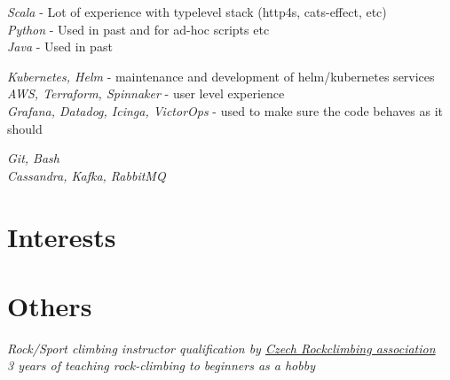 \documentclass[10pt]{article} %
\begin{document}
{
\textit{Scala} - Lot of experience with typelevel stack (http4s, cats-effect, etc)\\
\textit{Python} - Used in past and for ad-hoc scripts etc\\
\textit{Java} - Used in past\\
}


{
\textit{Kubernetes, Helm} - maintenance and development of helm/kubernetes services\\
\textit{AWS, Terraform, Spinnaker} - user level experience\\
\textit{Grafana, Datadog, Icinga, VictorOps} - used to make sure the code behaves as it should \\
}

{
\textit{Git, Bash} \\
\textit{Cassandra, Kafka, RabbitMQ}
}



\section{Interests}



\section{Others}
{
\textit{Rock/Sport climbing instructor qualification by \href{https://www.horosvaz.cz/}{Czech Rockclimbing association}}\\
\textit{3 years of teaching rock-climbing to beginners as a hobby}
}




\end{document}
